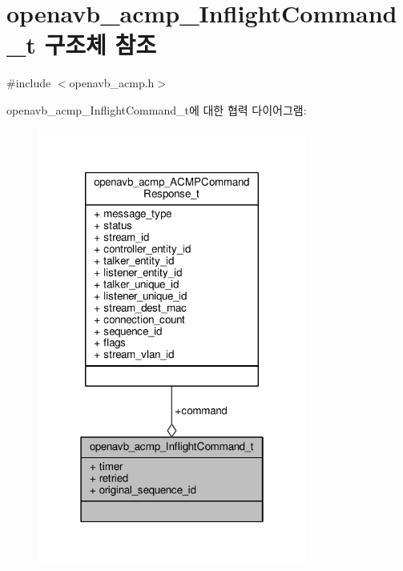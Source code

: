 \hypertarget{structopenavb__acmp___inflight_command__t}{}\section{openavb\+\_\+acmp\+\_\+\+Inflight\+Command\+\_\+t 구조체 참조}
\label{structopenavb__acmp___inflight_command__t}


{\ttfamily \#include $<$openavb\+\_\+acmp.\+h$>$}



openavb\+\_\+acmp\+\_\+\+Inflight\+Command\+\_\+t에 대한 협력 다이어그램\+:
\nopagebreak
\begin{figure}[H]
\begin{center}
\leavevmode
\includegraphics[width=250pt]{structopenavb__acmp___inflight_command__t__coll__graph}
\end{center}
\end{figure}
